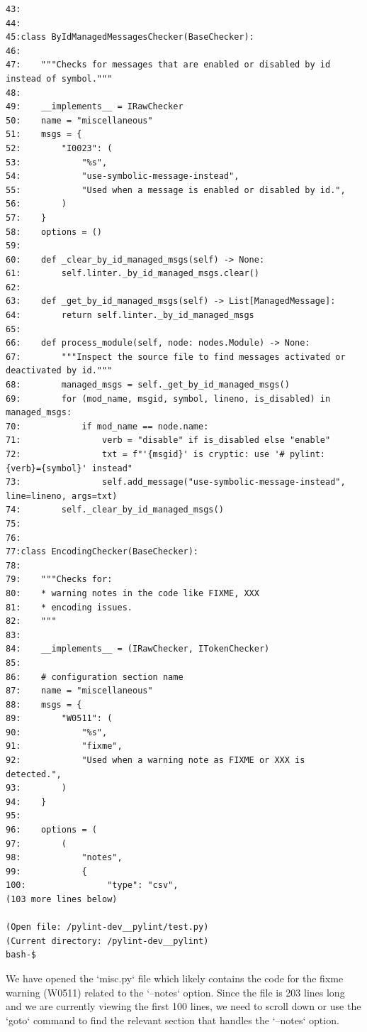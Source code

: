 {\begin{observationbox}
\begin{Verbatim}[breaklines=true, breakanywhere=true]
43:
44:
45:class ByIdManagedMessagesChecker(BaseChecker):
46:
47:    """Checks for messages that are enabled or disabled by id instead of symbol."""
48:
49:    __implements__ = IRawChecker
50:    name = "miscellaneous"
51:    msgs = {
52:        "I0023": (
53:            "%s",
54:            "use-symbolic-message-instead",
55:            "Used when a message is enabled or disabled by id.",
56:        )
57:    }
58:    options = ()
59:
60:    def _clear_by_id_managed_msgs(self) -> None:
61:        self.linter._by_id_managed_msgs.clear()
62:
63:    def _get_by_id_managed_msgs(self) -> List[ManagedMessage]:
64:        return self.linter._by_id_managed_msgs
65:
66:    def process_module(self, node: nodes.Module) -> None:
67:        """Inspect the source file to find messages activated or deactivated by id."""
68:        managed_msgs = self._get_by_id_managed_msgs()
69:        for (mod_name, msgid, symbol, lineno, is_disabled) in managed_msgs:
70:            if mod_name == node.name:
71:                verb = "disable" if is_disabled else "enable"
72:                txt = f"'{msgid}' is cryptic: use '# pylint: {verb}={symbol}' instead"
73:                self.add_message("use-symbolic-message-instead", line=lineno, args=txt)
74:        self._clear_by_id_managed_msgs()
75:
76:
77:class EncodingChecker(BaseChecker):
78:
79:    """Checks for:
80:    * warning notes in the code like FIXME, XXX
81:    * encoding issues.
82:    """
83:
84:    __implements__ = (IRawChecker, ITokenChecker)
85:
86:    # configuration section name
87:    name = "miscellaneous"
88:    msgs = {
89:        "W0511": (
90:            "%s",
91:            "fixme",
92:            "Used when a warning note as FIXME or XXX is detected.",
93:        )
94:    }
95:
96:    options = (
97:        (
98:            "notes",
99:            {
100:                "type": "csv",
(103 more lines below)

(Open file: /pylint-dev__pylint/test.py)
(Current directory: /pylint-dev__pylint)
bash-$
\end{Verbatim}
\end{observationbox}
\begin{agentbox}
We have opened the `misc.py` file which likely contains the code for the fixme warning (W0511) related to the `--notes` option. Since the file is 203 lines long and we are currently viewing the first 100 lines, we need to scroll down or use the `goto` command to find the relevant section that handles the `--notes` option.




\end{agentbox}}
